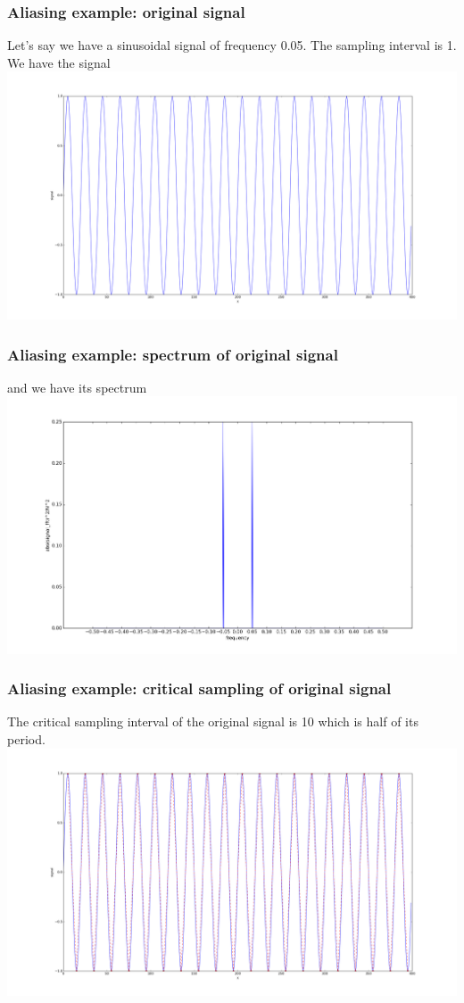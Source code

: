 \documentclass{beamer}
\begin{document}
\begin{frame}
\frametitle{Aliasing example: original signal}
Let's say we have a sinusoidal signal of frequency 0.05. The sampling interval is 1. We have the signal
\includegraphics[scale=0.2]{aliasing_original_signal.png}
\end{frame}
\begin{frame}
\frametitle{Aliasing example: spectrum of original signal}
and we have its spectrum
\includegraphics[scale=0.3]{aliasing_original_dft.png}
\end{frame}
\begin{frame}
\frametitle{Aliasing example: critical sampling of original signal}
The critical sampling interval of the original signal is 10 which is half of its period.
\includegraphics[scale=0.2]{worst_sample.png}
\end{frame}
\end{document}
